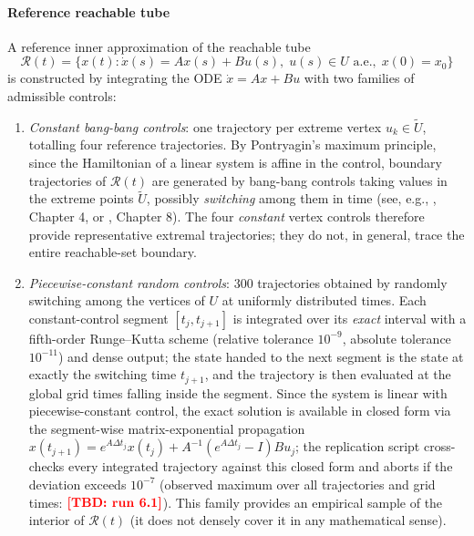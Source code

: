\documentclass[11pt]{elsarticle}
\newcommand{\TBD}[1]{{\color{red}\textbf{[TBD: #1]}}}
\providecommand{\LCIntSelfCheck}{\TBD{run 6.1}}
\theoremstyle{definition}
\theoremstyle{remark}
\numberwithin{equation}{section}
\begin{document}
\paragraph{Reference reachable tube}
A reference inner approximation of the reachable tube
\begin{equation}
  \label{eq:reachable-tube}
  \mathcal{R}(t)
  =
  \bigl\{
    x(t)
    :
    \dot{x}(s) = Ax(s) + Bu(s),\;
    u(s) \in U \text{ a.e.},\;
    x(0) = x_0
  \bigr\}
\end{equation}
is constructed by integrating the ODE $\dot{x} = Ax + Bu$ with two families
of admissible controls:
\begin{enumerate}
	\item[(a)] \emph{Constant bang-bang controls}: one trajectory per extreme
	vertex $u_k \in \widetilde{U}$, totalling four reference trajectories.
	By Pontryagin's maximum principle, since the Hamiltonian of a linear
	system is affine in the control, boundary trajectories of
	$\mathcal{R}(t)$ are generated by bang-bang controls taking values in
	the extreme points $\widetilde{U}$, possibly \emph{switching} among
	them in time (see, e.g., \cite{LeeMarkus1967}, Chapter 4, or
	\cite{aubin_cellina_1984}, Chapter 8). The four \emph{constant} vertex
	controls therefore provide representative extremal trajectories; they do
	not, in general, trace the entire reachable-set boundary.
  \item[(b)] \emph{Piecewise-constant random controls}: 300 trajectories obtained
        by randomly switching among the vertices of $U$ at uniformly
        distributed times. Each constant-control segment
        $[t_j,t_{j+1}]$ is integrated over its \emph{exact} interval with a
        fifth-order Runge--Kutta scheme (relative tolerance $10^{-9}$,
        absolute tolerance $10^{-11}$) and dense output; the state handed to
        the next segment is the state at exactly the switching time
        $t_{j+1}$, and the trajectory is then evaluated at the global grid
        times falling inside the segment. Since the system is linear with
        piecewise-constant control, the exact solution is available in
        closed form via the segment-wise matrix-exponential propagation
        $x(t_{j+1}) = e^{A\Delta t_j}x(t_j) + A^{-1}(e^{A\Delta t_j}-I)Bu_j$;
        the replication script cross-checks every integrated trajectory
        against this closed form and aborts if the deviation exceeds
        $10^{-7}$ (observed maximum over all trajectories and grid times:
        $\LCIntSelfCheck$).
        This family provides an empirical sample of the interior of
        $\mathcal{R}(t)$ (it does not densely cover it in any
        mathematical sense).
\end{enumerate}
\end{document}
